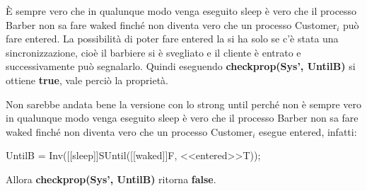 È sempre vero che in qualunque modo venga eseguito \textsf{sleep} è vero che il processo \textsf{Barber} non sa fare \textsf{waked} finché non diventa vero che un processo \textsf{Customer$_{i}$} può fare \textsf{entered}. La possibilità di poter fare \textsf{entered} la si ha solo se c'è stata una sincronizzazione, cioè il barbiere si è svegliato e il cliente è entrato e successivamente può segnalarlo. Quindi eseguendo \textbf{checkprop(Sys', UntilB)} si ottiene \textbf{true}, vale perciò la proprietà.

Non sarebbe andata bene la versione con lo strong until perché non è sempre vero in qualunque modo venga eseguito \textsf{sleep} è vero che il processo \textsf{Barber} non sa fare \textsf{waked} finché non diventa vero che un processo \textsf{Customer$_{i}$} esegue \textsf{entered}, infatti: 

\begin{center}
	 \textsf{UntilB = Inv([[sleep]]SUntil([[waked]]F, <<entered>>T));}
\end{center}

Allora \textbf{checkprop(Sys', UntilB)} ritorna \textbf{false}.




